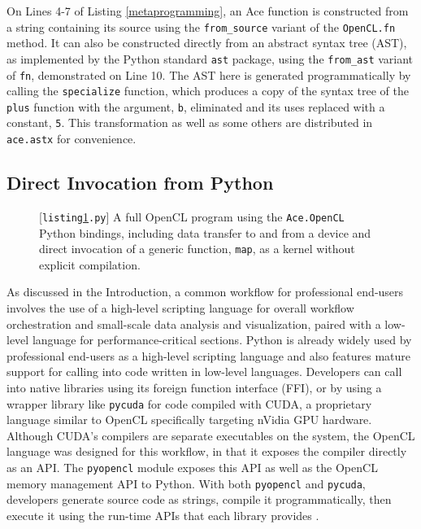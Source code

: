 \documentclass[10pt]{sigplanconf}
\begin{document}
On Lines 4-7 of Listing \ref{metaprogramming}, an Ace function is constructed from a string containing its source using the \verb|from_source| variant of the \verb|OpenCL.fn| method. It can also be constructed directly from an abstract syntax tree (AST), as implemented by the Python standard \verb|ast| package, using the \verb|from_ast| variant of \verb|fn|, demonstrated on Line 10. The AST here is generated programmatically by calling the \verb|specialize| function, which produces a copy of the syntax tree of the \verb|plus| function with the argument, \verb|b|, eliminated and its uses replaced with a constant, \verb|5|. This transformation as well as some others are distributed in \verb|ace.astx| for convenience.
\subsection{Direct Invocation from Python}\label{direct}

\begin{figure}

\caption{[\texttt{listing\ref{py}.py}] A full OpenCL program using the \texttt{Ace.OpenCL} Python bindings, including data transfer to and from a device and direct invocation of a generic function, \texttt{map}, as a kernel without explicit compilation.}
\label{py}
\end{figure}

As discussed in the Introduction, a common workflow for professional end-users involves the use of a high-level scripting language for overall workflow orchestration and small-scale data analysis and visualization, paired with a low-level language for performance-critical sections. Python is already widely used by professional end-users as a high-level scripting language and also features mature support for calling into code written in low-level languages. Developers can call into native libraries using its foreign function interface (FFI),  or by using a wrapper library like \verb|pycuda| for code compiled with CUDA, a proprietary language similar to OpenCL  specifically targeting nVidia GPU hardware. 
Although CUDA's compilers are separate executables on the system, the OpenCL language was designed for this workflow, in that it exposes the compiler directly as an API. The \verb|pyopencl| module exposes this API as well as the OpenCL memory management API to Python. With both \verb|pyopencl| and \verb|pycuda|, developers generate source code as strings, compile it programmatically, then execute it using the run-time APIs that each library provides \cite{pyopencl}.
\end{document}
